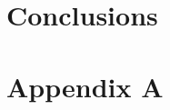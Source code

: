 \documentclass [11pt, proquest] {uwthesis}[2020/02/24]
\begin{document}
\chapter{Conclusions}
\label{chap:conclusions}

 
\printendnotes

%
%


%
%
\appendix
\raggedbottom\sloppy
 
 \chapter{Appendix A}
\label{sec:appendix_a}

\end{document}
